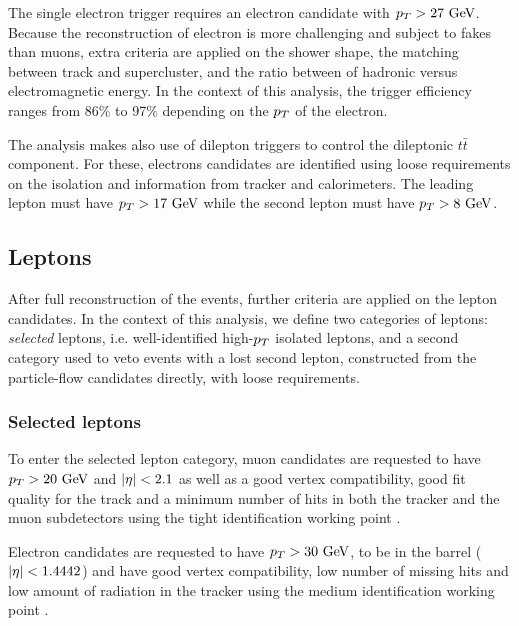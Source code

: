     The single electron trigger requires an electron candidate with $p_T > 27~\text{GeV}$. Because
    the reconstruction of electron is more challenging and subject to fakes than muons,
    extra criteria are applied on the shower shape, the matching between track and supercluster,
    and the ratio between of hadronic versus electromagnetic energy. In the context of this analysis,
    the trigger efficiency ranges from 86\% to 97\% depending on the $p_T$ of the
    electron.

    The analysis makes also use of dilepton triggers to control the dileptonic
    $t\bar{t}$ component. For these, electrons candidates are identified using loose
    requirements on the isolation and information from tracker and calorimeters. The
    leading lepton must have $p_T > 17~\text{GeV}$ while the second lepton must have $p_T > 8~\text{GeV}$.


        \subsection{Leptons}

    After full reconstruction of the events, further criteria are applied on the lepton
    candidates. In the context of this analysis, we define two categories of leptons:
    \emph{selected} leptons, i.e. well-identified high-$p_T$ isolated leptons, and a second
    category used to veto events with a lost second lepton, constructed from the particle-flow
    candidates directly, with loose requirements.

            \subsubsection{Selected leptons}

        To enter the selected lepton category, muon candidates are requested to have
    $p_T > 20~\text{GeV}$ and $\left| \eta \right| < 2.1$ as well as a good vertex compatibility, good fit
    quality for the track and a minimum number of hits in both the tracker and the muon
    subdetectors using the tight identification working point \cite{MuonID}.

        Electron candidates are requested to have $p_T > 30~\text{GeV}$, to be in the barrel
    ($\left| \eta \right| < 1.4442$) and have good vertex compatibility, low number of missing hits
    and low amount of radiation in the tracker using the medium identification working
    point \cite{ElectronID}.

